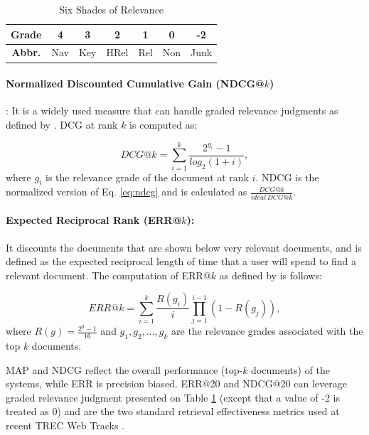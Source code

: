 \begin{table}
\caption{Six Shades of Relevance}
\label{tbl:levels}
\centering
\begin{tabular}{| c | c | c |  c | c |  c | c |}
\hline 
\bfseries  Grade &  4 & 3 & 2 & 1 & 0 & -2 \\
\hline 
\bfseries Abbr. & Nav &Key & HRel & Rel & Non & Junk \\
\hline
\end{tabular}
\end{table}

\paragraph{Normalized Discounted Cumulative Gain (NDCG@$k$)}: It is a widely used measure that can handle graded relevance judgments as defined by \citet*{ndcg}.
DCG at rank $k$ is computed as:

\begin{equation} \label{eq:ndcg}
DCG@k = \sum\limits_{i=1}^k \frac{2^{g_i}-1}{log_2(1+i)},
\end{equation}
where $g_i$ is the relevance grade of the document at rank $i$.
NDCG is the normalized version of Eq. \ref{eq:ndcg} and is calculated as $\frac{DCG@k} {ideal \, DCG@k} $.

\paragraph{Expected Reciprocal Rank (ERR@$k$):} It discounts the documents that are shown below very relevant documents, and is defined as the expected reciprocal length of time that a user will spend to find a relevant document.
The computation of ERR@$k$ as defined by \citet*{err} is follows:
  
\begin{equation} \label{eq:err}
ERR@k = \sum\limits_{i=1}^k \frac{R(g_i)} {i} \prod\limits_{j=1}^{i-1}{(1-R(g_j))},
\end{equation}
where $R(g)=\frac{2^g-1}{16}$ and $g_1,g_2,\ldots,g_k$ are the relevance grades associated with the top $k$ documents.

MAP and NDCG reflect the overall performance (top-$k$ documents) of the systems, while ERR is precision biased.
ERR@20 and NDCG@20 can leverage graded relevance judgment presented on Table \ref{tbl:levels} (except that a value of -2 is treated as 0) and are the two standard retrieval effectiveness metrics used at recent TREC Web Tracks \citep{2014web}.

